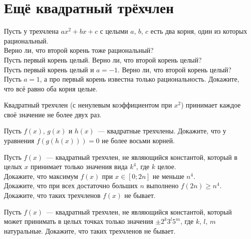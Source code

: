 

\section*{Ещё квадратный трёхчлен}



\begin{problems}

\item
Пусть у трехчлена $a x^2 + b x + c$ с целыми $a$, $b$, $c$ есть два корня, один
из которых рациональный.
\\
\sbp
Верно ли, что второй корень тоже рациональный?
\\
\sbp
Пусть первый корень целый.
Верно ли, что второй корень целый?
\\
\sbp
Пусть первый корень целый и $a = -1$.
Верно ли, что второй корень целый?
\\
\sbp
Пусть $a = 1$, а про первый корень известна только рациональность.
Докажите, что всё равно оба корня целые.

\end{problems}

\observation
Квадратный трехчлен (с ненулевым коэффициентом при $x^2$) принимает каждое
своё значение не более двух раз.

\begin{problems}

\item
Пусть $f(x)$, $g(x)$ и $h(x)$~--- квадратные трехчлены.
Докажите, что у уравнения $f(g(h(x))) = 0$ не более восьми корней.

\item
Пусть $f(x)$~--- квадратный трехчлен, не являющийся константой, который в целых
$x$ принимает только значения вида $k^4$, где $k$ целое.
\\
\sbp
Докажите, что максимум $f(x)$ при $x \in [0; 2n]$ не меньше $n^4$.
\\
\sbp
Докажите, что при всех достаточно больших $n$ выполнено $f(2n) \geq n^4$.
\\
\sbp
Докажите, что таких трехчленов $f(x)$ не бывает.

\item
Пусть $f(x)$~--- квадратный трехчлен, не являющийся константой, который может
принимать в целых точках только значения $\pm 2^k 3^l 5^m$,
где $k$, $l$, $m$ натуральные.
Докажите, что таких трехчленов не бывает.

\end{problems}

